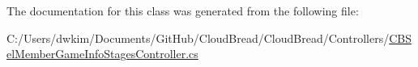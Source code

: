 The documentation for this class was generated from the following file\+:\begin{DoxyCompactItemize}
\item 
C\+:/\+Users/dwkim/\+Documents/\+Git\+Hub/\+Cloud\+Bread/\+Cloud\+Bread/\+Controllers/\hyperlink{_c_b_sel_member_game_info_stages_controller_8cs}{C\+B\+Sel\+Member\+Game\+Info\+Stages\+Controller.\+cs}\end{DoxyCompactItemize}
